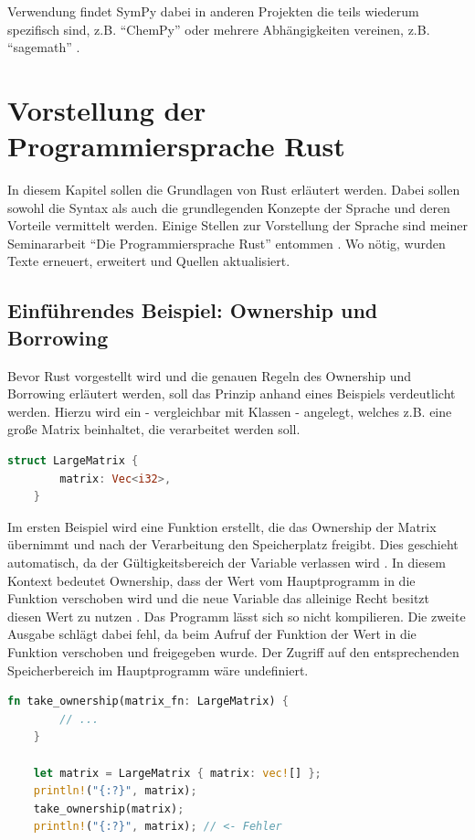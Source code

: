 \documentclass[11pt,a4paper, ngerman]{article}
\begin{document}
Verwendung findet SymPy dabei in anderen Projekten die teils wiederum spezifisch sind, z.B. ``ChemPy'' \cite{ChemPy} oder mehrere Abhängigkeiten vereinen, z.B. ``sagemath'' \cite {Sagemath}.

\newpage

\section{Vorstellung der Programmiersprache Rust}
In diesem Kapitel sollen die Grundlagen von Rust erläutert werden. Dabei sollen sowohl die Syntax als auch die grundlegenden Konzepte der Sprache und deren Vorteile vermittelt werden. Einige Stellen zur Vorstellung der Sprache sind meiner Seminararbeit ``Die Programmiersprache Rust'' entommen \cite{Seminararbeit}. Wo nötig, wurden Texte erneuert, erweitert und Quellen aktualisiert.

\subsection{Einführendes Beispiel: Ownership und Borrowing}
Bevor Rust vorgestellt wird und die genauen Regeln des Ownership und Borrowing erläutert werden, soll das Prinzip anhand eines Beispiels verdeutlicht werden. Hierzu wird ein  - vergleichbar mit Klassen - angelegt, welches z.B. eine große Matrix beinhaltet, die verarbeitet werden soll.

\begin{lstlisting}[language=rust, caption={Einführendes Beispiel: struct}]
    struct LargeMatrix {
        matrix: Vec<i32>,
    }
\end{lstlisting}

 Im ersten Beispiel wird eine Funktion erstellt, die das Ownership der Matrix übernimmt und nach der Verarbeitung den Speicherplatz freigibt. Dies geschieht automatisch, da der Gültigkeitsbereich der Variable  verlassen wird \cite{RustOwnershipFreed}. In diesem Kontext bedeutet Ownership, dass der Wert vom Hauptprogramm in die Funktion verschoben wird und die neue Variable  das alleinige Recht besitzt diesen Wert zu nutzen \cite{RustMovingTerm}. Das Programm lässt sich so nicht kompilieren. Die zweite Ausgabe schlägt dabei fehl, da beim Aufruf der Funktion der Wert in die Funktion verschoben und freigegeben wurde. Der Zugriff auf den entsprechenden Speicherbereich im Hauptprogramm wäre undefiniert.

 \begin{lstlisting}[language=rust, caption={Einführendes Beispiel: Ownership abgeben}]
    fn take_ownership(matrix_fn: LargeMatrix) {
        // ...
    }

    let matrix = LargeMatrix { matrix: vec![] };
    println!("{:?}", matrix);
    take_ownership(matrix);
    println!("{:?}", matrix); // <- Fehler
\end{lstlisting}
\end{document}
